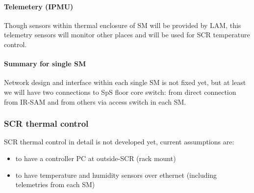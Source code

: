 \documentclass[a4paper,notitlepage]{article}
\begin{document}
\paragraph{Telemetery (IPMU)}

Though sensors within thermal enclosure of SM will be provided by LAM, 
this telemetry sensors will monitor other places and will be used for SCR 
temperature control. 

\paragraph{Summary for single SM}

Network design and interface within each single SM is not fixed yet, but 
at least we will have two connections to SpS floor core switch: 
from direct connection from IR-SAM and from others via access switch in 
each SM. 

%

\subsubsection{SCR thermal control}

SCR thermal control in detail is not developed yet, current assumptions are: 
\begin{itemize}
  \item to have a controller PC at outside-SCR (rack mount)
  \item to have temperature and humidity sensors over ethernet
    (including telemetries from each SM) 
\end{itemize}
\end{document}
